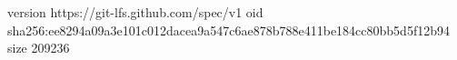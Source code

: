 version https://git-lfs.github.com/spec/v1
oid sha256:ee8294a09a3e101c012dacea9a547c6ae878b788e411be184cc80bb5d5f12b94
size 209236
